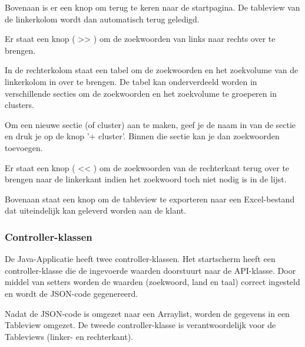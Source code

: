 Bovenaan is er een knop om terug te keren naar de startpagina. De tableview van de linkerkolom wordt dan automatisch terug geledigd. 

Er staat een knop ( >> ) om de zoekwoorden van links naar rechts over te brengen. 

In de rechterkolom staat een tabel om de zoekwoorden en het zoekvolume van de linkerkolom in over te brengen. De tabel kan onderverdeeld worden in verschillende secties om de zoekwoorden en het zoekvolume te groeperen in clusters. 

Om een nieuwe sectie (of cluster) aan te maken, geef je de naam in van de sectie en druk je op de knop '+ cluster'. Binnen die sectie kan je dan zoekwoorden toevoegen.

Er staat een knop ( << ) om de zoekwoorden van de rechterkant terug over te brengen naar de linkerkant indien het zoekwoord toch niet nodig is in de lijst. 

Bovenaan staat een knop om de tableview te exporteren naar een Excel-bestand dat uiteindelijk kan geleverd worden aan de klant. 


\subsubsection{Controller-klassen}
\label{ch: Controller-klassen}

De Java-Applicatie heeft twee controller-klassen. Het startscherm heeft een controller-klasse die de ingevoerde waarden doorstuurt naar de API-klasse. Door middel van setters worden de waarden (zoekwoord, land en taal) correct ingesteld en wordt de JSON-code gegenereerd. 

Nadat de JSON-code is omgezet naar een Arraylist, worden de gegevens in een Tableview omgezet. De tweede controller-klasse is verantwoordelijk voor de Tableviews (linker- en rechterkant). 


